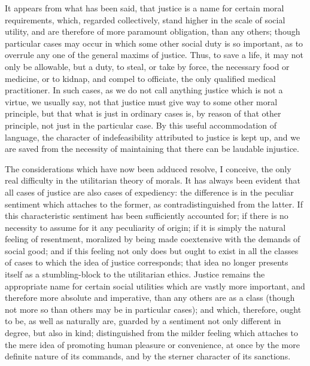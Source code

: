 \documentclass[12pt]{report}
\begin{document}
It appears from what has been said, that justice is a name for certain moral requirements, which, regarded collectively, stand higher in the scale of social utility, and are therefore of more paramount obligation, than any others; though particular cases may occur in which some other social duty is so important, as to overrule any one of the general maxims of justice. Thus, to save a life, it may not only be allowable, but a duty, to steal, or take by force, the necessary food or medicine, or to kidnap, and compel to officiate, the only qualified medical practitioner. In such cases, as we do not call anything justice which is not a virtue, we usually say, not that justice must give way to some other moral principle, but that what is just in ordinary cases is, by reason of that other principle, not just in the particular case. By this useful accommodation of language, the character of indefeasibility attributed to justice is kept up, and we are saved from the necessity of maintaining that there can be laudable injustice.

The considerations which have now been adduced resolve, I conceive, the only real difficulty in the utilitarian theory of morals. It has always been evident that all cases of justice are also cases of expediency: the difference is in the peculiar sentiment which attaches to the former, as contradistinguished from the latter. If this characteristic sentiment has been sufficiently accounted for; if there is no necessity to assume for it any peculiarity of origin; if it is simply the natural feeling of resentment, moralized by being made coextensive with the demands of social good; and if this feeling not only does but ought to exist in all the classes of cases to which the idea of justice corresponds; that idea no longer presents itself as a stumbling-block to the utilitarian ethics. Justice remains the appropriate name for certain social utilities which are vastly more important, and therefore more absolute and imperative, than any others are as a class (though not more so than others may be in particular cases); and which, therefore, ought to be, as well as naturally are, guarded by a sentiment not only different in degree, but also in kind; distinguished from the milder feeling which attaches to the mere idea of promoting human pleasure or convenience, at once by the more definite nature of its commands, and by the sterner character of its sanctions.
\end{document}
